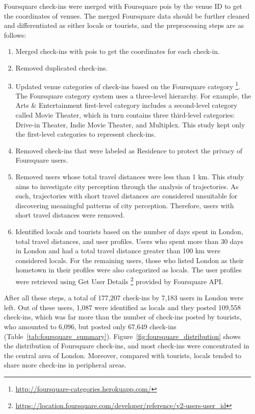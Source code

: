 \documentclass{article}
\theoremstyle{remark}
\begin{document}
Foursquare check-ins were merged with Foursquare \acrshort{poi}s by the venue ID to get the coordinates of venues. The merged Foursquare data should be further cleaned and differentiated as either locals or tourists, and the preprocessing steps are as follows:
\begin{enumerate}
    \item Merged check-ins with \acrshort{poi}s to get the coordinates for each check-in.
    \item Removed duplicated check-ins.
    \item Updated venue categories of check-ins based on the Foursquare category \footnote{\url{http://foursquare-categories.herokuapp.com/}}. The Foursquare category system uses a three-level hierarchy. For example, the Arts \& Entertainment first-level category includes a second-level category called Movie Theater, which in turn contains three third-level categories: Drive-in Theater, Indie Movie Theater, and Multiplex. This study kept only the first-level categories to represent 
    check-ins.
    \item Removed check-ins that were labeled as Residence to protect the privacy of Foursquare users.
    \item Removed users whose total travel distances were less than 1 km. This study aims to investigate city perception through the analysis of trajectories. As such, trajectories with short travel distances are considered unsuitable for discovering meaningful patterns of city perception. Therefore, users with short travel distances were removed.
    \item Identified locals and tourists based on the number of days spent in London, total travel distances, and user profiles. Users who spent more than 30 days in London and had a total travel distance greater than 100 km were considered locals. For the remaining users, those who listed London as their hometown in their profiles were also categorized as locals. The user profiles were retrieved using Get User Details \footnote{\url{https://location.foursquare.com/developer/reference/v2-users-user_id}} provided by Foursquare API.
\end{enumerate}

After all these steps, a total of 177,207 check-ins by 7,183 users in London were left. Out of these users, 1,087 were identified as locals and they posted 109,558 check-ins, which was far more than the number of check-ins posted by tourists, who amounted to 6,096, but posted only 67,649 check-ins (Table~\ref{tab:foursquare_summary}). Figure~\ref{fig:foursquare_distribution} shows the distribution of Foursquare check-ins, and most check-ins were concentrated in the central area of London. Moreover, compared with tourists, locals tended to share more check-ins in peripheral areas.
\end{document}
